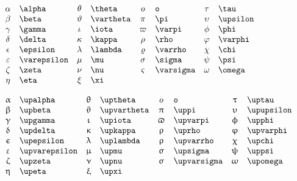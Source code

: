 \documentclass{article}
\begin{document}
    \begin{math}
        \begin{array}{clclclcl}
            \alpha & \verb=\alpha= & \theta & \verb=\theta= &  o & \verb=o=  & \tau & \verb=\tau= \\
            \beta & \verb=\beta= & \vartheta & \verb=\vartheta= & \pi & \verb=\pi= & \upsilon & \verb=\upsilon= \\
            \gamma & \verb=\gamma= & \iota & \verb=\iota= & \varpi & \verb=\varpi= & \phi & \verb=\phi= \\
            \delta & \verb=\delta= & \kappa & \verb=\kappa= & \rho & \verb=\rho= & \varphi & \verb=\varphi= \\
            \epsilon & \verb=\epsilon= & \lambda & \verb=\lambda= & \varrho & \verb=\varrho= & \chi & \verb=\chi= \\
            \varepsilon & \verb=\varepsilon= & \mu & \verb=\mu= & \sigma & \verb=\sigma= & \psi & \verb=\psi= \\
            \zeta & \verb=\zeta= & \nu & \verb=\nu= & \varsigma & \verb=\varsigma= & \omega & \verb=\omega= \\
            \eta & \verb=\eta= & \xi & \verb=\xi=
        \end{array}
    \end{math}

    \begin{math}
        \begin{array}{clclclcl}
            \upalpha & \verb=\upalpha= & \uptheta & \verb=\uptheta= &  o & \verb=o=  & \uptau & \verb=\uptau= \\
            \upbeta & \verb=\upbeta= & \upvartheta & \verb=\upvartheta= & \uppi & \verb=\uppi= & \upupsilon & \verb=\upupsilon= \\
            \upgamma & \verb=\upgamma= & \upiota & \verb=\upiota= & \upvarpi & \verb=\upvarpi= & \upphi & \verb=\upphi= \\
            \updelta & \verb=\updelta= & \upkappa & \verb=\upkappa= & \uprho & \verb=\uprho= & \upvarphi & \verb=\upvarphi= \\
            \upepsilon & \verb=\upepsilon= & \uplambda & \verb=\uplambda= & \upvarrho & \verb=\upvarrho= & \upchi & \verb=\upchi= \\
            \upvarepsilon & \verb=\upvarepsilon= & \upmu & \verb=\upmu= & \upsigma & \verb=\upsigma= & \uppsi & \verb=\uppsi= \\
            \upzeta & \verb=\upzeta= & \upnu & \verb=\upnu= & \upvarsigma & \verb=\upvarsigma= & \upomega & \verb=\upomega= \\
            \upeta & \verb=\upeta= & \upxi & \verb=\upxi=
        \end{array}
    \end{math}
\end{document}
